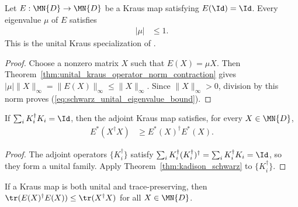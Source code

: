 \begin{theorem}
    \label{thm:unital_kraus_eigenvalue_bound}
    \leanok
    Let $E:\MN{D}\to\MN{D}$ be a Kraus map satisfying $E(\Id)=\Id$.
    Every eigenvalue $\mu$ of $E$ satisfies
    \begin{align}
        |\mu|
        &\leq 1.
        \label{eq:schwarz_unital_eigenvalue_bound}
    \end{align}
    This is the unital Kraus specialization of
    \cite[Proposition~6.1]{Wolf2012Quantum}.
\end{theorem}

\begin{proof}
    \leanok
    Choose a nonzero matrix $X$ such that $E(X)=\mu X$. Then
    Theorem~\ref{thm:unital_kraus_operator_norm_contraction} gives
    $|\mu|\|X\|_\infty=\|E(X)\|_\infty\leq\|X\|_\infty$.
    Since $\|X\|_\infty>0$, division by this norm proves
    (\ref{eq:schwarz_unital_eigenvalue_bound}).
\end{proof}

\begin{theorem}\label{thm:kadison_schwarz_adjoint}
    \leanok
    If $\sum_i K_i^\dagger K_i = \Id$, then the adjoint Kraus map satisfies,
    for every $X \in \MN{D}$,
    \begin{align}
        E^*(X^\dagger X)
        &\geq E^*(X)^\dagger E^*(X).
        \label{eq:schwarz_adjoint_kadison}
    \end{align}
\end{theorem}

\begin{proof}
    \leanok
    The adjoint operators $\{K_i^\dagger\}$ satisfy
    $\sum_i K_i^\dagger (K_i^\dagger)^\dagger
    = \sum_i K_i^\dagger K_i = \Id$, so they form a unital family.
    Apply Theorem~\ref{thm:kadison_schwarz} to $\{K_i^\dagger\}$.
\end{proof}

\begin{theorem}\label{thm:hs_contraction}
    \leanok
    If a Kraus map is both unital and trace-preserving, then
    $\tr(E(X)^\dagger E(X)) \le \tr(X^\dagger X)$
    for all $X \in \MN{D}$.
\end{theorem}

